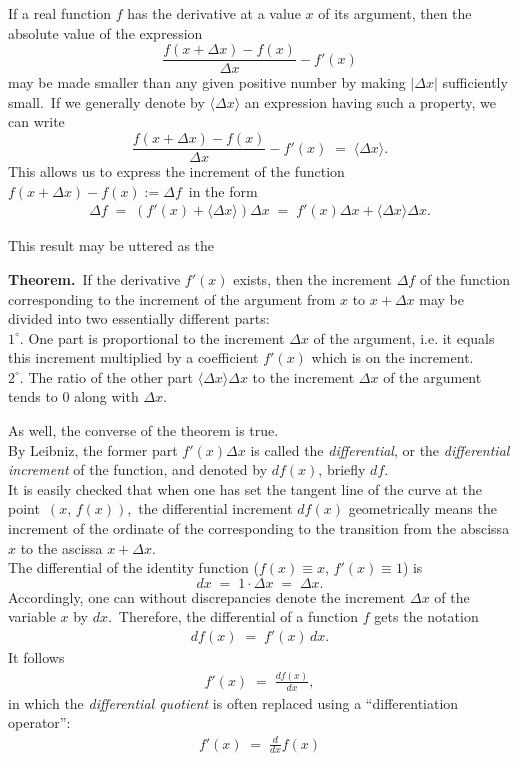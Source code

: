 \documentclass[12pt]{article}
\theoremstyle{definition}
\begin{document}
If a real function $f$ has the derivative at a value $x$ of its argument, 
then the absolute value of the expression
$$\frac{f(x\!+\!\Delta x)\!-\!f(x)}{\Delta x}-f'(x)$$
may be made smaller than any given positive number by making $|\Delta x|$ sufficiently small.\, If we generally denote by $\langle\Delta x\rangle$ an expression having such a property, we can write
$$\frac{f(x\!+\!\Delta x)\!-\!f(x)}{\Delta x}-f'(x) \;=\; \langle\Delta x\rangle.$$
This allows us to express the increment of the function \,$f(x\!+\!\Delta x)\!-\!f(x) := \Delta f$\, in the form
\begin{align}
\Delta f \;=\; (f'(x)\!+\!\langle\Delta x\rangle)\Delta x \;=\;f'(x)\Delta x+\langle\Delta x\rangle\Delta x.
\end{align}

This result may be uttered as the

\textbf{Theorem.}\, If the derivative $f'(x)$ exists, then the increment $\Delta f$ of the function corresponding to the increment of the argument from $x$ to $x\!+\!\Delta x$ may be divided into two essentially different parts:\\
$1^\circ$. One part is proportional to the increment $\Delta x$ of the argument, i.e. it equals this increment multiplied by a coefficient $f'(x)$ which is  on the increment.\\
$2^\circ$. The ratio of the other part $\langle\Delta x\rangle\Delta x$ to the increment $\Delta x$ of the argument tends to 0 along with $\Delta x$.

As well, the converse of the theorem is true.\\


By Leibniz, the former part $f'(x)\Delta x$ is called the \emph{differential}, or the \emph{differential increment} of the function, and denoted by $df(x)$, briefly $df$.\\

It is easily checked that when one has set the tangent line of the curve at the point \,$(x,\,f(x))$,\,  the differential increment $df(x)$ geometrically means the increment of the ordinate of the  corresponding to the transition from the abscissa $x$ to the ascissa $x\!+\!\Delta x$.\\


The differential of the identity function ($f(x) \equiv x$,\; $f'(x) \equiv 1$) is
$$dx \;=\; 1\cdot\Delta x \;=\; \Delta x.$$
Accordingly, one can without discrepancies denote the increment $\Delta x$ of the variable $x$ by $dx$.\, Therefore, the differential of a function $f$ gets the  notation
\begin{align}
df(x) \;=\; f'(x)\,dx.
\end{align}
It follows
\begin{align}
f'(x) \;=\; \frac{df(x)}{dx},
\end{align}
in which the \emph{differential quotient} is often replaced using a ``differentiation operator'':
\begin{align}
f'(x) \;=\; \frac{d}{dx}f(x)
\end{align}
\end{document}
